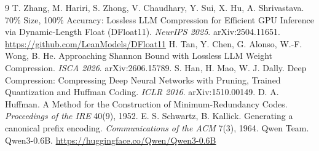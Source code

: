 \documentclass[11pt,a4paper]{article}
\begin{document}
\begin{thebibliography}{9}
 T. Zhang, M. Hariri, S. Zhong, V. Chaudhary, Y. Sui, X. Hu, A. Shrivastava. 70\% Size, 100\% Accuracy: Lossless LLM Compression for Efficient GPU Inference via Dynamic-Length Float (DFloat11). \emph{NeurIPS 2025}. arXiv:2504.11651. \url{https://github.com/LeanModels/DFloat11}
 H. Tan, Y. Chen, G. Alonso, W.-F. Wong, B. He. Approaching Shannon Bound with Lossless LLM Weight Compression. \emph{ISCA 2026}. arXiv:2606.15789.
 S. Han, H. Mao, W. J. Dally. Deep Compression: Compressing Deep Neural Networks with Pruning, Trained Quantization and Huffman Coding. \emph{ICLR 2016}. arXiv:1510.00149.
 D. A. Huffman. A Method for the Construction of Minimum-Redundancy Codes. \emph{Proceedings of the IRE} 40(9), 1952.
 E. S. Schwartz, B. Kallick. Generating a canonical prefix encoding. \emph{Communications of the ACM} 7(3), 1964.
 Qwen Team. Qwen3-0.6B. \url{https://huggingface.co/Qwen/Qwen3-0.6B}
\end{thebibliography}
\end{document}
